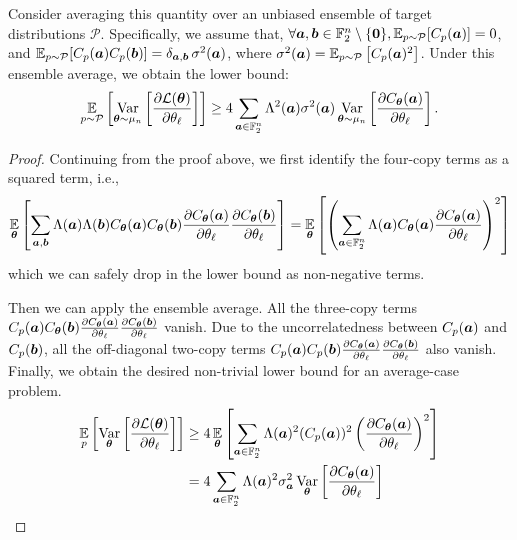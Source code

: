 \documentclass{article}
\theoremstyle{plain}
\theoremstyle{definition}
\theoremstyle{remark}
\begin{document}
Consider averaging this quantity over an unbiased ensemble of target distributions $\mathcal P$. Specifically, we assume that, $\forall{\bm{a}}, {\bm{b}} \in \mathbb{F}_2^n \setminus \{\bm{0}\},\operatorname*{\mathbb {E}}_{p\sim\mathcal {P}}[C_p({\bm{a}})]=0$, and $\operatorname*{\mathbb {E}}_{p\sim\mathcal {P}}\!\left[C_p({\bm{a}})C_p({\bm{b}})\right]=\delta_{{\bm{a}},{\bm{b}}}\,\sigma^2({\bm{a}})$, where $\sigma^2({\bm{a}}) = \operatorname*{\mathbb {E}}_{p \sim \mathcal{P}}\left[C_p({\bm{a}})^2\right]$. Under this ensemble average, we obtain the lower bound:
\begin{equation*}
\operatorname*{\mathbb{E}}_{p\sim\mathcal{P}} \left[\operatorname*{Var}_{{\bm{\theta}}\sim\mu_n}  
\left[\frac{\partial \mathcal{L}({\bm{\theta}})}{\partial \theta_\ell} \right]\right] \geq
4 \sum_{{\bm{a}}\in \mathbb{F}_2^n} \Lambda^2({\bm{a}})\sigma^2({\bm{a}})\operatorname*{Var}_{{\bm{\theta}}\sim\mu_n} \left[ \frac{\partial C_{\bm{\theta}}({\bm{a}})}{\partial \theta_\ell} \right].
\end{equation*}
\begin{proof}
Continuing from the proof above, we first identify the four-copy terms as a squared term, i.e.,
\begin{equation*}
    \operatorname*{\mathbb{E}}_{{\bm{\theta}}} \left[ \sum_{{\bm{a}}, {\bm{b}}} \Lambda({\bm{a}}) \Lambda({\bm{b}}) C_{\bm{\theta}}({\bm{a}}) C_{\bm{\theta}}({\bm{b}}) \frac{\partial C_{\bm{\theta}}({\bm{a}})}{\partial \theta_\ell} \frac{\partial C_{\bm{\theta}}({\bm{b}})}{\partial \theta_\ell}\right] =\operatorname*{\mathbb{E}}_{{\bm{\theta}}}\left[ \left(\sum_{{\bm{a}} \in \mathbb{F}_2^n} \Lambda({\bm{a}}) C_{\bm{\theta}}({\bm{a}}) \frac{\partial C_{\bm{\theta}}({\bm{a}})}{\partial \theta_\ell}\right)^2\right]
\end{equation*}
which we can safely drop in the lower bound as non-negative terms. 

Then we can apply the ensemble average. All the three-copy terms $C_p({\bm{a}}) C_{\bm{\theta}}({\bm{b}}) \frac{\partial C_{\bm{\theta}}({\bm{a}})}{\partial \theta_\ell} \frac{\partial C_{\bm{\theta}}({\bm{b}})}{\partial \theta_\ell}$ vanish. Due to the uncorrelatedness between $C_p({\bm{a}})$ and $C_p({\bm{b}})$, all the off-diagonal two-copy terms $C_p({\bm{a}}) C_p({\bm{b}}) \frac{\partial C_{\bm{\theta}}({\bm{a}})}{\partial \theta_\ell} \frac{\partial C_{\bm{\theta}}({\bm{b}})}{\partial \theta_\ell}$ also vanish. Finally, we obtain the desired non-trivial lower bound for an average-case problem.
\begin{align*}
 \operatorname*{\mathbb{E}}_p\left[\operatorname*{Var}_{{\bm{\theta}}} \left[ \frac{\partial \mathcal{L}({\bm{\theta}})}{\partial \theta_\ell} \right]\right] &\geq 4 \operatorname*{\mathbb{E}}_{{\bm{\theta}}}  \left[ \sum_{{\bm{a}} \in \mathbb{F}_2^n} \Lambda({\bm{a}})^2 (C_p({\bm{a}}))^2 \left(\frac{\partial C_{\bm{\theta}}({\bm{a}})}{\partial \theta_\ell}\right)^2 \right] \\
 &= 4 \sum_{{\bm{a}}\in\mathbb{F}_2^n}\Lambda({\bm{a}})^2\sigma_{\bm{a}}^2\operatorname*{Var}_{{\bm{\theta}}} \left[ \frac{\partial C_{\bm{\theta}}({\bm{a}})}{\partial \theta_\ell} \right]
\end{align*}
\end{proof}
\end{document}
